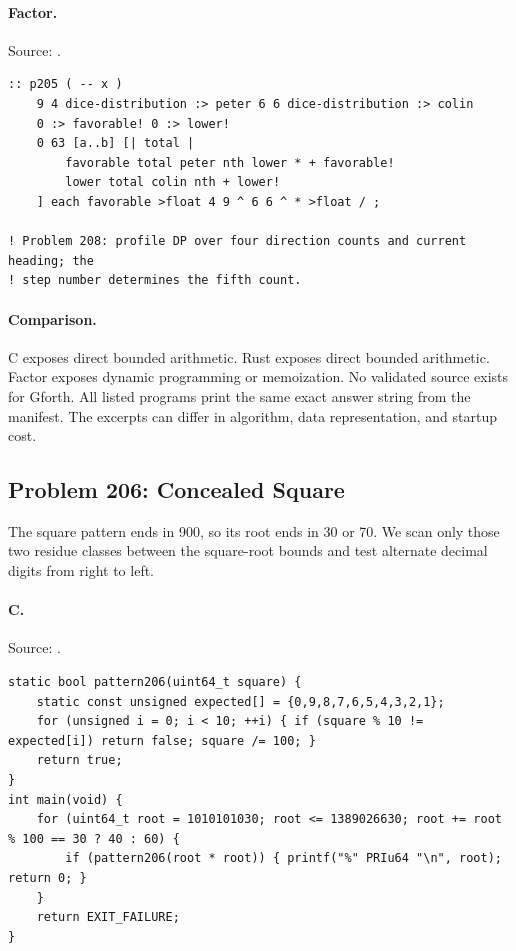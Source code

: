 \paragraph{Factor.} Source: .
\begin{lstlisting}
:: p205 ( -- x )
    9 4 dice-distribution :> peter 6 6 dice-distribution :> colin
    0 :> favorable! 0 :> lower!
    0 63 [a..b] [| total |
        favorable total peter nth lower * + favorable!
        lower total colin nth + lower!
    ] each favorable >float 4 9 ^ 6 6 ^ * >float / ;

! Problem 208: profile DP over four direction counts and current heading; the
! step number determines the fifth count.
\end{lstlisting}

\paragraph{Comparison.}
C exposes direct bounded arithmetic. Rust exposes direct bounded arithmetic. Factor exposes dynamic programming or memoization.
No validated source exists for Gforth.
All listed programs print the same exact answer string from the manifest. The excerpts can differ in algorithm, data representation, and startup cost.

\subsection{Problem 206: Concealed Square}
\label{walkthrough:p206}
The square pattern ends in 900, so its root ends in 30 or 70. We scan only those two residue classes between the square-root bounds and test alternate decimal digits from right to left.

\paragraph{C.} Source: .
\begin{lstlisting}
static bool pattern206(uint64_t square) {
    static const unsigned expected[] = {0,9,8,7,6,5,4,3,2,1};
    for (unsigned i = 0; i < 10; ++i) { if (square % 10 != expected[i]) return false; square /= 100; }
    return true;
}
int main(void) {
    for (uint64_t root = 1010101030; root <= 1389026630; root += root % 100 == 30 ? 40 : 60) {
        if (pattern206(root * root)) { printf("%" PRIu64 "\n", root); return 0; }
    }
    return EXIT_FAILURE;
}
\end{lstlisting}

